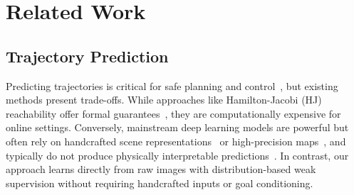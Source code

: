 \documentclass[nonacm,sigconf]{acmart}
\begin{document}
\section{Related Work}\label{related}


\subsection{Trajectory Prediction}



Predicting trajectories is critical for safe planning and control~\cite[]{fridovich2020confidence}, but existing methods present trade-offs. While approaches like Hamilton-Jacobi (HJ) reachability offer formal guarantees~\cite[]{li2021prediction,nakamura2023online}, they are computationally expensive for online settings. Conversely, mainstream deep learning models are powerful but often rely on handcrafted scene representations~\cite[]{salzmann2020trajectron++} or high-precision maps~\cite[]{itkina2023interpretable, hsu2023interpretable}, and typically do not produce physically interpretable predictions~\cite[]{lu2024towards, lindemann2023conformal, ruchkin2022confidence}. In contrast, our approach learns directly from raw images with distribution-based weak supervision without requiring handcrafted inputs or goal conditioning.
\end{document}
